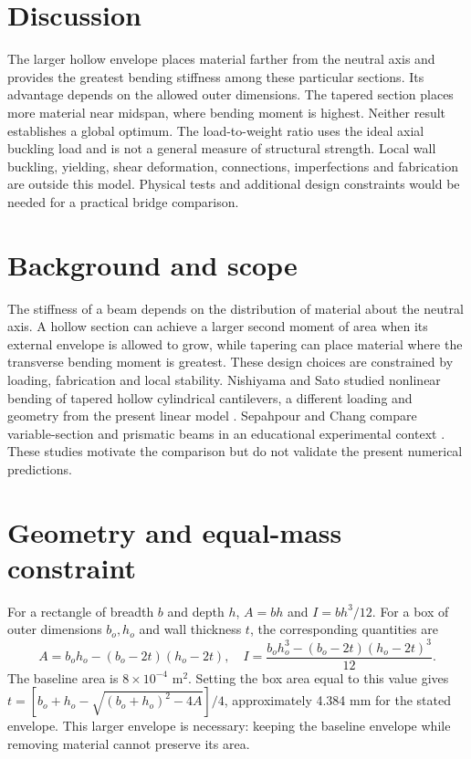 \documentclass[11pt]{article}
\begin{document}
\section{Discussion}
The larger hollow envelope places material farther from the neutral axis and provides the greatest bending stiffness among these particular sections. Its advantage depends on the allowed outer dimensions. The tapered section places more material near midspan, where bending moment is highest. Neither result establishes a global optimum. The load-to-weight ratio uses the ideal axial buckling load and is not a general measure of structural strength. Local wall buckling, yielding, shear deformation, connections, imperfections and fabrication are outside this model. Physical tests and additional design constraints would be needed for a practical bridge comparison.

\section{Background and scope}
The stiffness of a beam depends on the distribution of material about the neutral axis. A hollow section can achieve a larger second moment of area when its external envelope is allowed to grow, while tapering can place material where the transverse bending moment is greatest. These design choices are constrained by loading, fabrication and local stability. Nishiyama and Sato studied nonlinear bending of tapered hollow cylindrical cantilevers, a different loading and geometry from the present linear model \cite{nishiyama}. Sepahpour and Chang compare variable-section and prismatic beams in an educational experimental context \cite{sepahpour}. These studies motivate the comparison but do not validate the present numerical predictions.

\section{Geometry and equal-mass constraint}
For a rectangle of breadth $b$ and depth $h$, $A=bh$ and $I=bh^3/12$. For a box of outer dimensions $b_o,h_o$ and wall thickness $t$, the corresponding quantities are
\begin{equation}
 A=b_oh_o-(b_o-2t)(h_o-2t),\quad I=\frac{b_oh_o^3-(b_o-2t)(h_o-2t)^3}{12}.
\end{equation}
The baseline area is $8\times10^{-4}$ m$^2$. Setting the box area equal to this value gives $t=[b_o+h_o-\sqrt{(b_o+h_o)^2-4A}]/4$, approximately 4.384 mm for the stated envelope. This larger envelope is necessary: keeping the baseline envelope while removing material cannot preserve its area.
\end{document}
